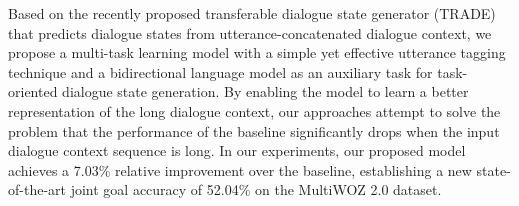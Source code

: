 Based on the recently proposed transferable dialogue state generator (TRADE) that predicts dialogue states from utterance-concatenated dialogue context, we propose a multi-task learning model with a simple yet effective utterance tagging technique and a bidirectional language model as an auxiliary task for task-oriented dialogue state generation. By enabling the model to learn a better representation of the long dialogue context, our approaches attempt to solve the problem that the performance of the baseline significantly drops when the input dialogue context sequence is long. In our experiments, our proposed model achieves a 7.03\% relative improvement over the baseline, establishing a new state-of-the-art joint goal accuracy of 52.04\% on the MultiWOZ 2.0 dataset.
